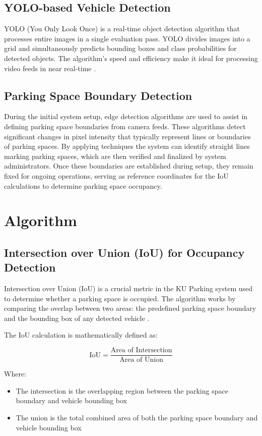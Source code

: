 \subsection{YOLO-based Vehicle Detection}
YOLO (You Only Look Once) is a real-time object detection algorithm that processes entire images in a single evaluation pass.
YOLO divides images into a grid and simultaneously predicts bounding boxes and class probabilities for detected objects. 
The algorithm's speed and efficiency make it ideal for processing video feeds in near real-time \cite{YOLO}.

\subsection{Parking Space Boundary Detection}
During the initial system setup, edge detection algorithms are used to assist in defining parking space boundaries from camera feeds. 
These algorithms detect significant changes in pixel intensity that typically represent lines or boundaries of parking spaces. 
By applying techniques the system can identify straight lines marking parking spaces, 
which are then verified and finalized by system administrators. Once these boundaries are established during setup, 
they remain fixed for ongoing operations, serving as reference coordinates for the IoU calculations to determine parking space occupancy.

\section{Algorithm}
\label{section:algorithm}
\subsection{Intersection over Union (IoU) for Occupancy Detection}
Intersection over Union (IoU) is a crucial metric in the KU Parking system used to determine whether a parking space is occupied. 
The algorithm works by comparing the overlap between two areas: the predefined parking space boundary and the bounding box of any detected vehicle \cite{barseghyan2023parking}.

The IoU calculation is mathematically defined as:

\[
\text{IoU} = \frac{\text{Area of Intersection}}{\text{Area of Union}}
\]

Where:
\begin{itemize}
    \item The intersection is the overlapping region between the parking space boundary and vehicle bounding box
    \item The union is the total combined area of both the parking space boundary and vehicle bounding box
\end{itemize}

